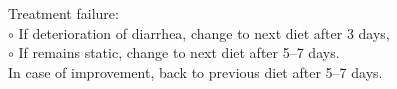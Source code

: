\documentclass[11pt,a4paper]{report}
\begin{document}

\noindent {\color{red}$\star\star$} Treatment failure: \\
$\circ$ If deterioration of diarrhea, change to next diet after 3 days,\\
$\circ$ If remains static, change to next diet after 5--7 days. \\

\noindent {\color{red}$\star$} In case of improvement, back to previous diet after 5--7 days. 
\end{document}
